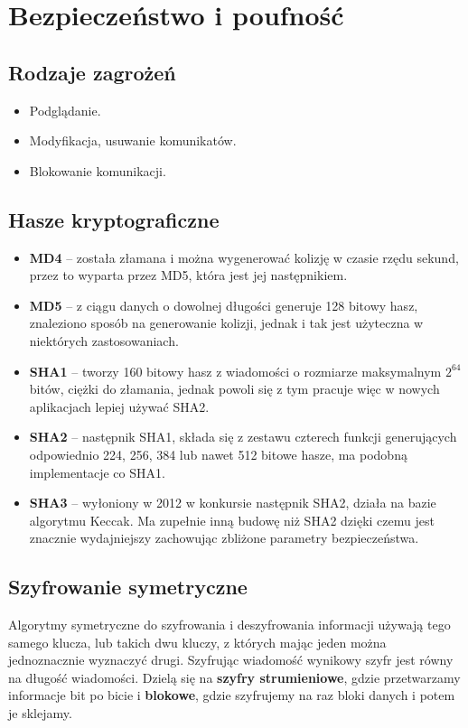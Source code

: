 \section{Bezpieczeństwo i poufność}

\subsection{Rodzaje zagrożeń}
\begin{itemize}
	\item Podglądanie.
	\item Modyfikacja, usuwanie komunikatów.
	\item Blokowanie komunikacji.
\end{itemize}

\subsection{Hasze kryptograficzne}
\begin{itemize}
	\item \textbf{MD4} -- została złamana i można wygenerować kolizję w czasie rzędu sekund, przez to wyparta przez MD5, która jest jej następnikiem.
	\item \textbf{MD5} -- z ciągu danych o dowolnej długości generuje 128 bitowy hasz, znaleziono sposób na generowanie kolizji, jednak i tak jest użyteczna w niektórych zastosowaniach.
	\item \textbf{SHA1} -- tworzy 160 bitowy hasz z wiadomości o rozmiarze maksymalnym \(2^{64}\) bitów, ciężki do złamania, jednak powoli się z tym pracuje więc w nowych aplikacjach lepiej używać SHA2.
	\item \textbf{SHA2} -- następnik SHA1, składa się z zestawu czterech funkcji generujących odpowiednio 224, 256, 384 lub nawet 512 bitowe hasze, ma podobną implementacje co SHA1.
	\item \textbf{SHA3} -- wyłoniony w 2012 w konkursie następnik SHA2, działa na bazie algorytmu Keccak. Ma zupełnie inną budowę niż SHA2 dzięki czemu jest znacznie wydajniejszy zachowując zbliżone parametry bezpieczeństwa.
\end{itemize}

\subsection{Szyfrowanie symetryczne}
Algorytmy symetryczne do szyfrowania i deszyfrowania informacji używają tego samego klucza, lub takich dwu kluczy, z których mając jeden można jednoznacznie wyznaczyć drugi. Szyfrując wiadomość wynikowy szyfr jest równy na długość wiadomości. Dzielą się na \textbf{szyfry strumieniowe}, gdzie przetwarzamy informacje bit po bicie i \textbf{blokowe}, gdzie szyfrujemy na raz bloki danych i potem je sklejamy.

